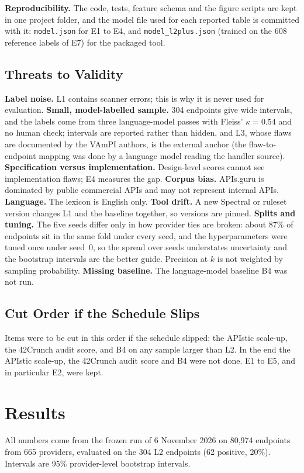 \documentclass[conference]{IEEEtran}
\begin{document}
\textbf{Reproducibility.} The code, tests, feature schema and the figure scripts are kept in
one project folder, and the model file used for each reported table is committed with it: \texttt{model.json} for E1 to E4, and \texttt{model\_l2plus.json} (trained on the 608 reference labels of E7) for the packaged tool.

\subsection{Threats to Validity}
\textbf{Label noise.} L1 contains scanner errors; this is why it is never used for evaluation.
\textbf{Small, model-labelled sample.} 304 endpoints give wide intervals, and the labels come from three language-model passes with Fleiss' $\kappa=0.54$ and no human check; intervals are reported rather
than hidden, and L3, whose flaws are documented by the VAmPI authors, is the external anchor (the flaw-to-endpoint mapping was done by a language model reading the handler source). \textbf{Specification versus implementation.} Design-level scores cannot see
implementation flaws; E4 measures the gap. \textbf{Corpus bias.} APIs.guru is dominated by
public commercial APIs and may not represent internal APIs. \textbf{Language.} The lexicon is
English only. \textbf{Tool drift.} A new Spectral or ruleset version changes L1 and the
baseline together, so versions are pinned. \textbf{Splits and tuning.} The five seeds differ only in how provider ties are broken: about 87\% of endpoints sit in the same fold under every seed, and the hyperparameters were tuned once under seed~0, so the spread over seeds understates uncertainty and the bootstrap intervals are the better guide. Precision at $k$ is not weighted by sampling probability. \textbf{Missing baseline.} The language-model baseline B4 was not run.

\subsection{Cut Order if the Schedule Slips}
Items were to be cut in this order if the schedule slipped: the APIstic scale-up, the 42Crunch audit score, and B4 on any sample larger than L2. In the end the APIstic scale-up, the 42Crunch audit score and B4 were not done. E1 to E5, and in particular E2, were kept.

\section{Results}
\label{sec:results}
All numbers come from the frozen run of 6 November 2026 on 80{,}974 endpoints from 665 providers,
evaluated on the 304 L2 endpoints (62 positive, 20\%). Intervals are 95\% provider-level bootstrap intervals.
\end{document}
